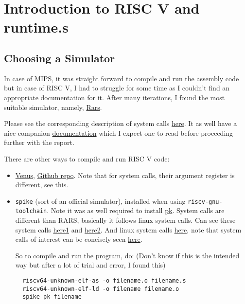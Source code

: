 \chapter{Introduction to RISC V and runtime.s}

\section{Choosing a Simulator}

In case of MIPS, it was straight forward to compile and run the assembly code but in case of RISC V, I had to struggle for some time as I couldn't find an appropriate documentation for it. After many iterations, I found the most suitable simulator, namely, \href{https://github.com/TheThirdOne/rars}{Rars}.

Please see the corresponding description of system calls \href{https://github.com/TheThirdOne/rars/wiki/Environment-Calls}{here}. It as well have a nice companion \href{https://github.com/TheThirdOne/rars/wiki}{documentation} which I expect one to read before proceeding further with the report.

There are other ways to compile and run RISC V code:

\begin{itemize}

  \item \href{http://www.kvakil.me/venus/}{Venus}, \href{https://github.com/kvakil/venus}{Github repo}. Note that for system calls, their argument register is different, see \href{https://github.com/TheThirdOne/rars/issues/45}{this}. 

  \item \texttt{spike} (sort of an official simulator), installed when using \texttt{riscv-gnu-toolchain}. Note it was as well required to install \href{https://github.com/riscv/riscv-pk}{pk}. System calls are different than RARS, basically it follows linux system calls. Can see these system calls \href{https://github.com/riscv/riscv-pk/blob/master/pk/syscall.c}{here1} and \href{https://github.com/riscv/riscv-pk/blob/master/pk/syscall.h}{here2}. And linux system calls \href{http://man7.org/linux/man-pages/man2/syscalls.2.html}{here}, note that system calls of interest can be concisely seen \href{https://rv8.io/syscalls.html}{here}.
  
  So to compile and run the program, do: (Don't know if this is the intended way but after a lot of trial and error, I found this)
  
  \begin{verbatim}
  riscv64-unknown-elf-as -o filename.o filename.s 
  riscv64-unknown-elf-ld -o filename filename.o 
  spike pk filename
  \end{verbatim}

\end{itemize}

